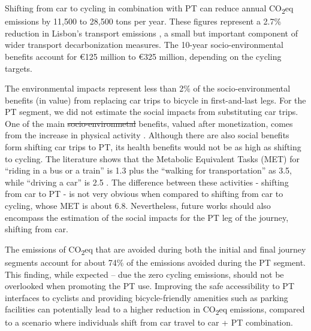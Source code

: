 \documentclass[review, doubleblind, 3p,
authoryear]{elsarticle} %
\providecommand{\DIFaddtex}[1]{{\protect\color{blue}\uwave{#1}}} %
\providecommand{\DIFdeltex}[1]{{\protect\color{red}\sout{#1}}}                      %
\providecommand{\DIFaddbegin}{} %
\providecommand{\DIFaddend}{} %
\providecommand{\DIFdelbegin}{} %
\providecommand{\DIFdelend}{} %
\providecommand{\DIFadd}[1]{\texorpdfstring{\DIFaddtex{#1}}{#1}} %
\providecommand{\DIFdel}[1]{\texorpdfstring{\DIFdeltex{#1}}{}} %
\newcommand{\DIFscaledelfig}{0.5}
\newlength{\DIFdelgraphicswidth} %
\newlength{\DIFdelgraphicsheight} %
\newcommand{\DIFaddincludegraphics}[2][]{{\color{blue}\fbox{\DIFOincludegraphics[#1]{#2}}}} %
\newcommand{\DIFdelincludegraphics}[2][]{%
\sbox{\DIFdelgraphicsbox}{\DIFOincludegraphics[#1]{#2}}%
\settoboxwidth{\DIFdelgraphicswidth}{\DIFdelgraphicsbox} %
\settoboxtotalheight{\DIFdelgraphicsheight}{\DIFdelgraphicsbox} %
\scalebox{\DIFscaledelfig}{%
\parbox[b]{\DIFdelgraphicswidth}{\usebox{\DIFdelgraphicsbox}\\[-\baselineskip] \rule{\DIFdelgraphicswidth}{0em}}\llap{\resizebox{\DIFdelgraphicswidth}{\DIFdelgraphicsheight}{%
\setlength{\unitlength}{\DIFdelgraphicswidth}%
\begin{picture}(1,1)%
\thicklines\linethickness{2pt} %
{\color[rgb]{1,0,0}\put(0,0){\framebox(1,1){}}}%
{\color[rgb]{1,0,0}\put(0,0){\line( 1,1){1}}}%
{\color[rgb]{1,0,0}\put(0,1){\line(1,-1){1}}}%
\end{picture}%
}\hspace*{3pt}}} %
} %
\DeclareRobustCommand{\DIFaddbegin}{\DIFOaddbegin \let\includegraphics\DIFaddincludegraphics} %
\DeclareRobustCommand{\DIFaddend}{\DIFOaddend \let\includegraphics\DIFOincludegraphics} %
\DeclareRobustCommand{\DIFdelbegin}{\DIFOdelbegin \let\includegraphics\DIFdelincludegraphics} %
\DeclareRobustCommand{\DIFdelend}{\DIFOaddend \let\includegraphics\DIFOincludegraphics} %
\begin{document}
Shifting from car to cycling in combination with PT can reduce annual
CO\textsubscript{2}eq emissions by 11,500 to 28,500 tons per year. These
figures represent a 2.7\% reduction in Lisbon's transport emissions
\citep{LisboaENova}, a small but important component of wider transport
decarbonization measures. The 10-year socio-environmental benefits
account for €125 million to €325 million, depending on the cycling
targets.

The environmental impacts represent less than 2\% of the
socio-environmental benefits (in value) from replacing car trips to
bicycle in first-and-last legs. For the PT segment, we did not estimate
the social impacts from substituting car trips. One of the main
\DIFdelbegin \DIFdel{socio-environmetal }\DIFdelend \DIFaddbegin \DIFadd{socio-environmental }\DIFaddend benefits, valued after monetization, comes from the
increase in physical activity \citep{Felix2023ES}. Although there are
also social benefits form shifting car trips to PT, its health benefits
would not be as high as shifting to cycling. The literature shows that
the Metabolic Equivalent Tasks (MET) for ``riding in a bus or a train''
is 1.3 plus the ``walking for transportation'' as 3.5, while ``driving a
car'' is 2.5 \citep{MET2011}. The difference between these activities -
shifting from car to PT - is not very obvious when compared to shifting
from car to cycling, whose MET is about 6.8. Nevertheless, future works
should also encompass the estimation of the social impacts for the PT
leg of the journey, shifting from car.

The emissions of CO\textsubscript{2}eq that are avoided during both the
initial and final journey segments account for about 74\% of the
emissions avoided during the PT segment. This finding, while expected --
due the zero cycling emissions, should not be overlooked when promoting
the PT use. Improving the safe accessibility to PT interfaces to
cyclists and providing bicycle-friendly amenities such as parking
facilities can potentially lead to a higher reduction in
CO\textsubscript{2}eq emissions, compared to a scenario where
individuals shift from car travel to car + PT combination.
\end{document}
